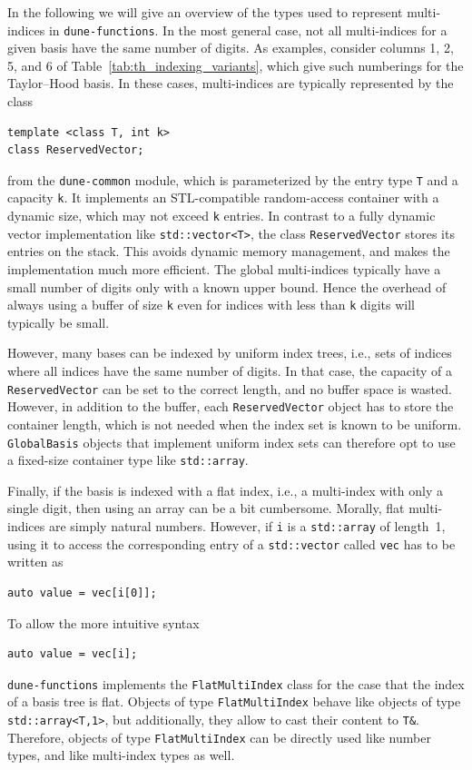 \documentclass[a4paper,10pt,headings=normal,bibliography=totoc]{scrartcl}
\newcommand{\cpp}[1]{\lstinline[basicstyle=\ttfamily]!#1!}
\newcommand{\dunemodule}[1]{\texttt{#1}}
\begin{document}
In the following we will
give an overview of the types used to represent multi-indices
in \dunemodule{dune-functions}.
In the most general case, not all multi-indices for a given basis have
the same number of digits.  As examples, consider columns 1, 2, 5, and 6
of Table~\ref{tab:th_indexing_variants}, which give such numberings for the Taylor--Hood basis.
In these cases, multi-indices are typically represented
by the class
\begin{lstlisting}[style=Interface]
template <class T, int k>
class ReservedVector;
\end{lstlisting}
from the \dunemodule{dune-common} module, which is parameterized
by the entry type \cpp{T} and a capacity \cpp{k}.
It implements an STL-compatible random-access container with a dynamic size,
which may not exceed \cpp{k} entries.
In contrast to a fully dynamic vector implementation
like \cpp{std::vector<T>}, the class \cpp{ReservedVector} stores its entries
on the stack.  This avoids dynamic memory management, and makes the
implementation much more efficient. The global multi-indices typically have
a small number of digits only with a known upper bound.
Hence the overhead of always using a buffer of size \cpp{k} even
for indices with less than \cpp{k} digits will typically be small.

However, many bases can be indexed by uniform index trees, i.e., sets of indices where
all indices have the same number of digits.  In that case, the capacity of a
\cpp{ReservedVector} can be set to the correct length, and no buffer space is wasted.
However, in addition to the buffer, each \cpp{ReservedVector} object has to store
the container length, which is not needed when the index set is known to be uniform.
\cpp{GlobalBasis} objects that implement uniform index sets can therefore
opt to use a fixed-size container type like \cpp{std::array}.

Finally, if the basis is indexed with a flat index, i.e., a multi-index with only a single digit,
then using an array can be a bit cumbersome.  Morally, flat multi-indices
are simply natural numbers.  However, if \cpp{i} is a \cpp{std::array} of length~1,
using it to access the corresponding entry of a \cpp{std::vector} called \cpp{vec} has to be
written as
\begin{lstlisting}
auto value = vec[i[0]];
\end{lstlisting}
To allow the more intuitive syntax
\begin{lstlisting}
auto value = vec[i];
\end{lstlisting}
\dunemodule{dune-functions} implements the \cpp{FlatMultiIndex} class for the
case that the index
of a basis tree is flat.  Objects of type \cpp{FlatMultiIndex}
behave like objects of type \cpp{std::array<T,1>}, but additionally, they allow to cast
their content to \cpp{T&}.  Therefore, objects of type \cpp{FlatMultiIndex} can be directly used
like number types, and like multi-index types as well.
\end{document}
